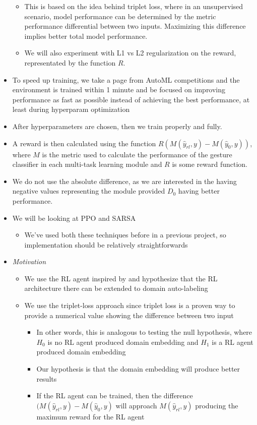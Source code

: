 \begin{itemize}
\begin{itemize}
		\item This is based on the idea behind triplet loss, where in an unsupervised scenario, model performance can be determined by the metric performance differential between two inputs. Maximizing this difference implies better total model performance.
		\item We will also experiment with L1 vs L2 regularization on the reward, representated by the function $R$.
	\end{itemize}
	\item To speed up training, we take a page from AutoML competitions and the environment is trained within 1 minute and be focused on improving performance as fast as possible instead of achieving the best performance, at least during hyperparam optimization
	\item After hyperparameters are chosen, then we train properly and fully.
	\item A reward is then calculated using the function $R\left(M\left(\hat{y}_{rl}, y\right)-M\left(\hat{y}_{0}, y\right)\right)$, where $M$ is the metric used to calculate the performance of the gesture classifier in each multi-task learning module and $R$ is some reward function.
	\item We do not use the absolute difference, as we are interested in the having negative values representing the module provided $D_0$ having better performance.
	\item We will be looking at PPO \cite{schulman2017proximal} and SARSA \cite{rummery1994line}
	\begin{itemize}
		\item We've used both these techniques before in a previous project, so implementation should be relatively straightforwards
	\end{itemize}
	\item \emph{Motivation}
	\begin{itemize}
		\item We use the RL agent inspired by \cite{ma2021location} and hypothesize that the RL architecture there can be extended to domain auto-labeling
		\item We use the triplet-loss approach since triplet loss is a proven way to provide a numerical value showing the difference between two input
		\begin{itemize}
			\item In other words, this is analogous to testing the null hypothesis, where $H_0$ is no RL agent produced domain embedding and $H_1$ is a RL agent produced domain embedding
			\item Our hypothesis is that the domain embedding will produce better results
			\item If the RL agent can be trained, then the difference $(M\left(\hat{y}_{rl}, y\right)-M\left(\hat{y}_{0}, y\right)$ will approach $M\left(\hat{y}_{rl}, y\right)$ producing the maximum reward for the RL agent
		\end{itemize}
	\end{itemize}
\end{itemize}

